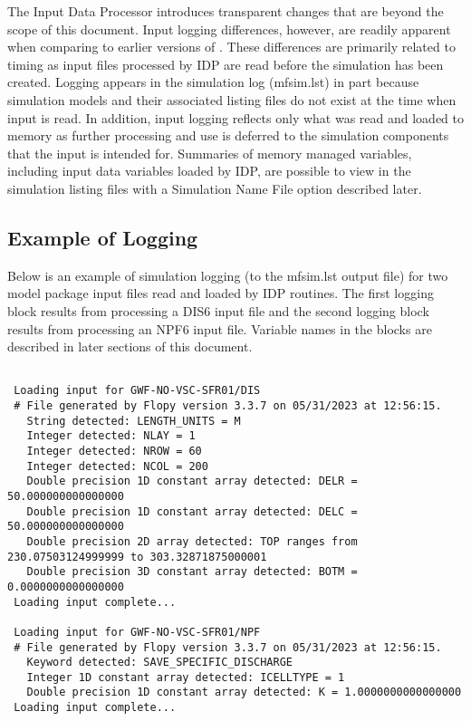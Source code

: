 The Input Data Processor introduces transparent changes that are beyond the scope of this document.  Input logging differences, however, are readily apparent when comparing to earlier versions of \mf.  These differences are primarily related to timing as input files processed by IDP are read before the simulation has been created.  Logging appears in the simulation log (mfsim.lst) in part because simulation models and their associated listing files do not exist at the time when input is read.  In addition, input logging reflects only what was read and loaded to memory as further processing and use is deferred to the simulation components that the input is intended for.  Summaries of memory managed variables, including input data variables loaded by IDP, are possible to view in the simulation listing files with a Simulation Name File option described later. 

\subsection{Example of Logging}

Below is an example of simulation logging (to the mfsim.lst output file) for two model package input files read and loaded by IDP routines.  The first logging block results from processing a DIS6 input file and the second logging block results from processing an NPF6 input file.  Variable names in the blocks are described in later sections of this document.

\small
\begin{lstlisting}[style=modeloutput]

 Loading input for GWF-NO-VSC-SFR01/DIS
 # File generated by Flopy version 3.3.7 on 05/31/2023 at 12:56:15.
   String detected: LENGTH_UNITS = M
   Integer detected: NLAY = 1
   Integer detected: NROW = 60
   Integer detected: NCOL = 200
   Double precision 1D constant array detected: DELR = 50.000000000000000
   Double precision 1D constant array detected: DELC = 50.000000000000000
   Double precision 2D array detected: TOP ranges from 230.07503124999999 to 303.32871875000001
   Double precision 3D constant array detected: BOTM = 0.0000000000000000
 Loading input complete...

 Loading input for GWF-NO-VSC-SFR01/NPF
 # File generated by Flopy version 3.3.7 on 05/31/2023 at 12:56:15.
   Keyword detected: SAVE_SPECIFIC_DISCHARGE
   Integer 1D constant array detected: ICELLTYPE = 1
   Double precision 1D constant array detected: K = 1.0000000000000000
 Loading input complete...
\end{lstlisting}
